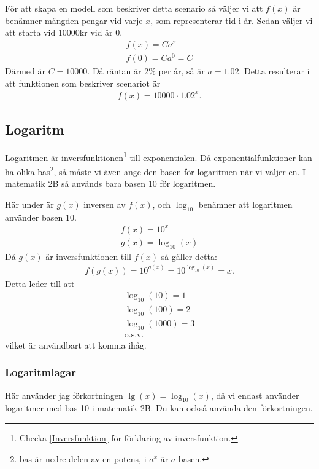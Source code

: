 För att skapa en modell som beskriver detta scenario så väljer vi att $f(x)$ är benämner mängden pengar vid varje $x$, som representerar tid i år. Sedan väljer vi att starta vid 10000kr vid år 0.
\begin{align}
	f(x)=Ca^x \\
	f(0)=Ca^0 = C
\end{align}
Därmed är $C = 10000$. Då räntan är 2\% per år, så är $a=1.02$. Detta resulterar i att funktionen som beskriver scenariot är
\begin{align}
	f(x)=10000\cdot1.02^x.
\end{align}

\newpage
\subsection{Logaritm}

Logaritmen är inversfunktionen\footnote{Checka \ref{Inversfunktion} för förklaring av inversfunktion.} till exponentialen. Då exponentialfunktioner kan ha olika bas\footnote{bas är nedre delen av en potens, i $a^x$ är $a$ basen.}, så måste vi även ange den basen för logaritmen när vi väljer en. I matematik 2B så används bara basen 10 för logaritmen.

Här under är $g(x)$ inversen av $f(x)$, och $\log_{10}$ benämner att logaritmen använder basen 10.
\begin{align}
	f(x) = 10^x \\
	g(x) = \log_{10}(x)
\end{align}
Då $g(x)$ är inversfunktionen till $f(x)$ så gäller detta:
\begin{align}
	f(g(x)) = 10^{g(x)} = 10^{\log_{10}(x)} = x.
\end{align}
Detta leder till att
\begin{align}
	\log_{10}(10) = 1 \\
	\log_{10}(100) = 2 \\
	\log_{10}(1000) = 3 \\
	\text{o.s.v.}
\end{align}
vilket är användbart att komma ihåg.

\newpage
\subsubsection{Logaritmlagar}

Här använder jag förkortningen $\lg(x) = \log_{10}(x)$, då vi endast använder logaritmer med bas 10 i matematik 2B. Du kan också använda den förkortningen.

